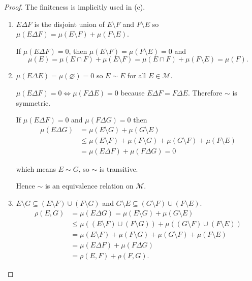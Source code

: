 \begin{proof}
    The finiteness is implicitly used in (c).
    \begin{enumerate}[itemsep=0pt,label={\textbf{\alph*.}}]
        \item \( E \Delta F \) is the disjoint union of \( E \setminus F \) and \( F \setminus E \) so \( \mu(E \Delta F) = \mu(E \setminus F) + \mu(F \setminus E) \).

              If \( \mu(E \Delta F) = 0 \), then \( \mu(E \setminus F) = \mu(F \setminus E) = 0 \) and
              \[
                  \mu(E) = \mu(E \cap F) + \mu(E \setminus F) = \mu(E \cap F) + \mu(F \setminus E) = \mu(F).
              \]
        \item \( \mu(E \Delta E) = \mu(\varnothing) = 0 \) so \( E \sim E \) for all \( E \in \mathcal{M} \).

              \( \mu(E \Delta F) = 0 \iff \mu(F \Delta E) = 0 \) because \( E \Delta F = F \Delta E \). Therefore \( \sim \) is symmetric.

              If \( \mu(E \Delta F) = 0 \) and \( \mu(F \Delta G) = 0 \) then
              \begingroup
              \allowdisplaybreaks%
              \begin{align*}
                  \mu(E \Delta G) & = \mu(E \setminus G) + \mu(G \setminus E)                                             \\
                                  & \le \mu(E \setminus F) + \mu(F \setminus G) + \mu(G \setminus F) + \mu(F \setminus E) \\
                                  & = \mu(E \Delta F) + \mu(F \Delta G) = 0
              \end{align*}
              \endgroup

              which means \( E \sim G \), so \( \sim \) is transitive.

              Hence \( \sim \) is an equivalence relation on \( \mathcal{M} \).
        \item \( E \setminus G \subseteq (E \setminus F) \cup (F \setminus G) \) and \( G \setminus E \subseteq (G \setminus F) \cup (F \setminus E) \).
              \begingroup
              \allowdisplaybreaks%
              \begin{align*}
                  \rho(E, G) & = \mu(E \Delta G) = \mu(E \setminus G) + \mu(G \setminus E)                               \\
                             & \le \mu((E \setminus F) \cup (F \setminus G)) + \mu((G \setminus F) \cup (F \setminus E)) \\
                             & = \mu(E \setminus F) + \mu(F \setminus G) + \mu(G \setminus F) + \mu(F \setminus E)       \\
                             & = \mu(E \Delta F) + \mu(F \Delta G)                                                       \\
                             & = \rho(E, F) + \rho(F, G).
              \end{align*}
              \endgroup
    \end{enumerate}
\end{proof}


